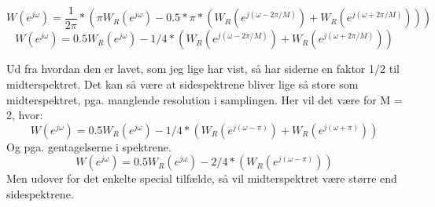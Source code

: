 \begin{Opgaver}
\begin{kapitel}
\begin{Opgave}
\begin{UnderOpgave}
                \[W(e^{j\omega}) = \frac{1}{2\pi} * (\pi W_R(e^{j\omega}) - 0.5 * \pi * (W_R(e^{j(\omega - 2\pi/M)}) + W_R(e^{j(\omega + 2\pi/M)})))\]
                \[W(e^{j\omega}) = 0.5W_R(e^{j\omega}) - 1/4 * (W_R(e^{j(\omega - 2\pi/M)}) + W_R(e^{j(\omega + 2\pi/M)}))\]                
            \end{UnderOpgave}
            \begin{UnderOpgave}
                Ud fra hvordan den er lavet, som jeg lige har vist, så har siderne en faktor 1/2 til midterspektret. Det kan så være at sidespektrene bliver lige så store som midterspektret, pga. manglende resolution i samplingen. 
                Her vil det være for M = 2, hvor: 
                \[W(e^{j\omega}) = 0.5W_R(e^{j\omega}) - 1/4 * (W_R(e^{j(\omega - \pi)}) + W_R(e^{j(\omega + \pi)}))\]                
                Og pga. gentagelserne i spektrene. 
                \[W(e^{j\omega}) = 0.5W_R(e^{j\omega}) - 2/4 * (W_R(e^{j(\omega - \pi)}))\]                
                Men udover for det enkelte special tilfælde, så vil midterspektret være større end sidespektrene. 
            \end{UnderOpgave}
        \end{Opgave}       
    \end{kapitel}
\end{Opgaver}

